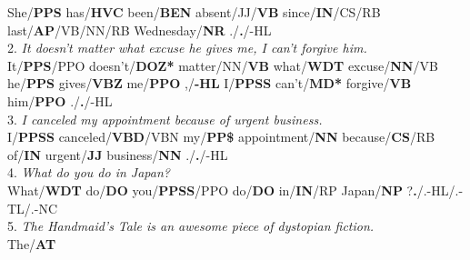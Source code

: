 \documentclass[11pt,a4paper,twocolumn]{article}
\begin{document}
	She/\textcolor{hlit}{\textbf{PPS}}
	has/\textcolor{hlit}{\textbf{HVC}}
	been/\textcolor{hlit}{\textbf{BEN}}
	absent/\textcolor{hlit}{JJ/\textbf{VB}} 
	since/\textcolor{hlit}{\textbf{IN}/CS/RB} 
	last/\textcolor{hlit}{\textbf{AP}/VB/NN/RB}
	Wednesday/\textcolor{hlit}{\textbf{NR}}
	./\textbf{.}/\textcolor{hlit}{-HL}\\
	$ $\\
	2. \textit{It doesn't matter what excuse he gives me, I 
	can't forgive him.}\\
	It/\textcolor{hlit}{\textbf{PPS}/PPO }
	doesn't/\textcolor{hlit}{\textbf{DOZ*}} 
	matter/\textcolor{hlit}{NN/\textbf{VB} }
	what/\textcolor{hlit}{\textbf{WDT} }
	excuse/\textcolor{hlit}{\textbf{NN}/VB} 
	he/\textcolor{hlit}{\textbf{PPS} }
	gives/\textcolor{hlit}{\textbf{VBZ}} 
	me/\textcolor{hlit}{\textbf{PPO} }
	,/\textcolor{hlit}{\textbf{-HL} }
	I/\textcolor{hlit}{\textbf{PPSS} } 
	can't/\textcolor{hlit}{\textbf{MD*}} 
	forgive/\textcolor{hlit}{\textbf{VB}} 
	him/\textcolor{hlit}{\textbf{PPO} }
	./\textcolor{hlit}{\textbf{.}/-HL}\\
	$ $\\%
	3. \textit{I canceled my appointment because of urgent business.}\\
	I/\textcolor{hlit}{\textbf{PPSS} }
	canceled/\textcolor{hlit}{\textbf{VBD}/VBN }
	my/\textcolor{hlit}{\textbf{PP\$}}
	appointment/\textcolor{hlit}{\textbf{NN}}
	because/\textcolor{hlit}{\textbf{CS}/RB} 
	of/\textcolor{hlit}{\textbf{IN} }
	urgent/\textcolor{hlit}{\textbf{JJ}}
	business/\textcolor{hlit}{\textbf{NN}} 
	./\textcolor{hlit}{\textbf{.}/-HL}\\
	$ $\\%
	4. \textit{What do you do in Japan?}\\
	What/\textcolor{hlit}{\textbf{WDT}} 
	do/\textcolor{hlit}{\textbf{DO} }
	you/\textcolor{hlit}{\textbf{PPSS}/PPO }
	do/\textcolor{hlit}{\textbf{DO} }
	in/\textcolor{hlit}{\textbf{IN}/RP }
	Japan/\textcolor{hlit}{\textbf{NP}}
	?\textcolor{hlit}{\textbf{.}/.-HL/.-TL/.-NC}\\
	$ $\\%
	5. \textit{The Handmaid’s Tale is an awesome piece of dystopian 
	fiction.}\\
	The/\textcolor{hlit}{\textbf{AT} }
\end{document}
